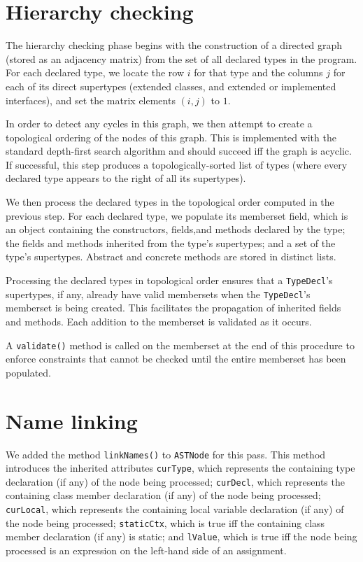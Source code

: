 \documentclass[12pt]{article}
\newcommand{\code}[1]{\texttt{#1}}
\begin{document}
\section{Hierarchy checking}

The hierarchy checking phase begins with the construction of a directed graph (stored as an adjacency matrix) from the set of all declared types in the program.  For each declared type, we locate the row $i$ for that type and the columns $j$ for each of its direct supertypes (extended classes, and extended or implemented interfaces), and set the matrix elements $(i,j)$ to $1$.

In order to detect any cycles in this graph, we then attempt to create a topological ordering of the nodes of this graph.  This is implemented with the standard depth-first search algorithm and should succeed iff the graph is acyclic.  If successful, this step produces a topologically-sorted list of types (where every declared type appears to the right of all its supertypes).

We then process the declared types in the topological order computed in the previous step.  For each declared type, we populate its memberset field, which is an object containing the constructors, fields,and methods declared by the type; the fields and methods inherited from the type's supertypes; and a set of the type's supertypes.  Abstract and concrete methods are stored in distinct lists.

Processing the declared types in topological order ensures that a \code{TypeDecl}'s supertypes, if any, already have valid membersets when the \code{TypeDecl}'s memberset is being created.  This facilitates the propagation of inherited fields and methods. Each addition to the memberset is validated as it occurs.

A \code{validate()} method is called on the memberset at the end of this procedure to enforce constraints that cannot be checked until the entire memberset has been populated.

\section{Name linking}

We added the method \code{linkNames()} to \code{ASTNode} for this pass. This method introduces the inherited attributes \code{curType}, which represents the containing type declaration (if any) of the node being processed; \code{curDecl}, which represents the containing class member declaration (if any) of the node being processed; \code{curLocal}, which represents the containing local variable declaration (if any) of the node being processed; \code{staticCtx}, which is true iff the containing class member declaration (if any) is static; and \code{lValue}, which is true iff the node being processed is an expression on the left-hand side of an assignment.
\end{document}
